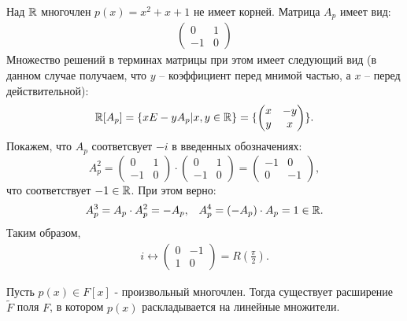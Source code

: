 \begin{example}
    Над $\mathbb{R}$ многочлен $p(x) = x^2 + x + 1$ не имеет корней. Матрица $A_p$ имеет вид:
    \begin{gather*}
        \begin{pmatrix}
        0      & 1      \\
        -1     & 0      
        \end{pmatrix}
    \end{gather*}
    Множество решений в терминах матрицы при этом имеет следующий вид (в данном случае получаем, что $y$ -- коэффициент перед мнимой частью, а $x$ -- перед действительной):
    $$\mathbb{R}[A_p] = \{x E - y A_p \vert x, y \in \mathbb{R}\} = \{\begin{pmatrix}
        x     & -y      \\
        y     & x      
        \end{pmatrix}\}.$$
    Покажем, что $A_p$ соответсвует $-i$ в введенных обозначениях: \\
    $$A_p^2 = \begin{pmatrix}
        0      & 1      \\
        -1     & 0      
        \end{pmatrix} \cdot \begin{pmatrix}
        0      & 1      \\
        -1     & 0      
        \end{pmatrix} = \begin{pmatrix}
        -1      & 0      \\
        0     & -1      
        \end{pmatrix},$$
        что соответствует $-1 \in \mathbb{R}$. При этом верно:
        \begin{align*}
            A_p^3 = A_p \cdot A_p^2 = -A_p, && A_p^4 = (-A_p) \cdot A_p = 1 \in \mathbb{R}.
        \end{align*}
        Таким образом,
        \begin{gather*}
        i \longleftrightarrow \begin{pmatrix}
        0      & -1      \\
        1     & 0      
        \end{pmatrix} = R(\frac{\pi}{2}).
        \end{gather*}
\end{example}

\begin{corollary}
    Пусть $p(x) \in F[x]$ - произвольный многочлен. Тогда существует расширение $\tilde{F}$ поля $F$, в котором $p(x)$ раскладывается на линейные множители.
\end{corollary}

